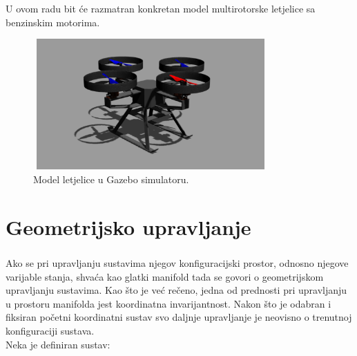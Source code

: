 \documentclass[times, utf8, diplomski]{fer}
\begin{document}
\noindent U ovom radu bit će razmatran konkretan model multirotorske letjelice sa benzinskim motorima. 

\begin{figure}[h!]
	\includegraphics[width=9cm, height=5cm]{figures/morus_crop.png}
	\centering
	\caption{Model letjelice u Gazebo simulatoru.}
\end{figure}

\chapter{Geometrijsko upravljanje}
	
	\paragraph{}Ako se pri upravljanju sustavima njegov konfiguracijski prostor, odnosno njegove varijable stanja, shvaća kao glatki manifold tada se govori o geometrijskom upravljanju sustavima. Kao što je već rečeno, jedna od prednosti pri upravljanju u prostoru manifolda jest koordinatna invarijantnost. Nakon što je odabran i fiksiran početni koordinatni sustav svo daljnje upravljanje je neovisno o trenutnoj konfiguraciji sustava. \\
	Neka je definiran sustav:
	
\end{document}
